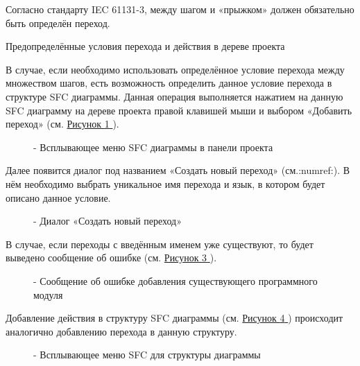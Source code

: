 \documentclass[letterpaper,10pt,russian]{sphinxmanual}
\begin{document}
Согласно стандарту IEC 61131-3, между шагом и «прыжком» должен
обязательно быть определён переход.

Предопределённые условия перехода и действия в дереве проекта

В случае, если необходимо использовать определённое условие перехода
между множеством шагов, есть возможность определить данное условие
перехода в структуре SFC диаграммы. Данная операция выполняется нажатием
на данную SFC диаграмму на дереве проекта правой клавишей мыши
и выбором «Добавить переход» (см. \hyperref[usage_guide/ide_components:image110]{Рисунок \ref{usage_guide/ide_components:image110} }).
\begin{figure}[htbp]
\centering
\capstart

\noindent{}
\caption{- Всплывающее меню SFC диаграммы в панели проекта}\label{usage_guide/ide_components:image110}\end{figure}

Далее появится диалог под названием «Создать новый переход» (см.:numref:).
В нём необходимо выбрать уникальное имя перехода и язык, в котором
будет описано данное условие.
\begin{figure}[htbp]
\centering
\capstart

\noindent{}
\caption{- Диалог «Создать новый переход»}\label{usage_guide/ide_components:image111}\end{figure}

В случае, если переходы с введённым именем уже существуют, то будет
выведено сообщение об ошибке (см. \hyperref[usage_guide/ide_components:image112]{Рисунок \ref{usage_guide/ide_components:image112} }).
\begin{figure}[htbp]
\centering
\capstart

\noindent{}
\caption{- Сообщение об ошибке добавления существующего программного модуля}\label{usage_guide/ide_components:image112}\end{figure}

Добавление действия в структуру SFC диаграммы (см. \hyperref[usage_guide/ide_components:image113]{Рисунок \ref{usage_guide/ide_components:image113} }) происходит
аналогично добавлению перехода в данную структуру.
\begin{figure}[htbp]
\centering
\capstart

\noindent{}
\caption{- Всплывающее меню SFC для структуры диаграммы}\label{usage_guide/ide_components:image113}\end{figure}
\end{document}
